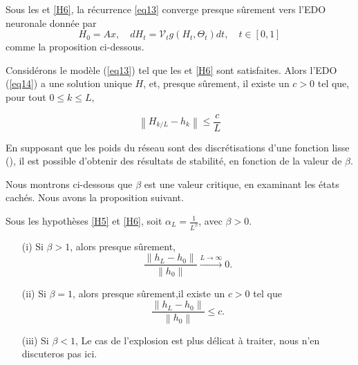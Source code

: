Sous les  et \ref{H6}, la récurrence \ref{eq13} converge presque sûrement vers l'EDO neuronale donnée par
\begin{equation}\label{eq14}
    H_0=A x, \quad d H_t=\mathscr{V}_t g\left(H_t, \Theta_t\right) d t, \quad t \in[0,1]
\end{equation}
comme la proposition ci-dessous.

\begin{proposition}\label{prop11}
    Considérons le modèle (\ref{eq13}) tel que les  et \ref{H6} sont satisfaites. Alors l'EDO (\ref{eq14}) a une solution unique $H$, et, presque sûrement, il existe un $c > 0$
    tel que, pour tout $0 \leqslant k \leqslant L$,

    \begin{equation}  
    \left\|H_{k / L}-h_k\right\| \leqslant \frac{c}{L}
    \end{equation}
\end{proposition}

En supposant que les poids du réseau sont des discrétisations d'une fonction lisse (), il est possible d'obtenir des résultats de stabilité, en fonction de la valeur de $\beta$.

Nous montrons ci-dessous que $\beta$ est une valeur critique, en examinant les états cachés. Nous avons la proposition suivant.

\begin{proposition}\label{prop12}
    Sous les hypothèses \ref{H5} et \ref{H6}, soit $\alpha_L = \frac{1}{L^{\beta}}$, avec $\beta >0 $.
    \begin{itemize}
        \item [(i)] Si $\beta > 1 $, alors presque sûrement, 
            \[
                \frac{\left\| h_L - h_0 \right\| }{\left\| h_0 \right\| } \xrightarrow{L \to \infty } 0 
            .\]
        \item [(ii)] Si $\beta = 1 $, alors presque sûrement,il existe un $c > 0$ tel que
            \[
                \frac{\left\| h_L - h_0 \right\| }{\left\| h_0 \right\| } \leqslant c
            .\]
        \item [(iii)] Si $\beta < 1 $, Le cas de l'explosion est plus délicat à traiter, nous n'en discuteros pas ici.
    \end{itemize}
\end{proposition}

